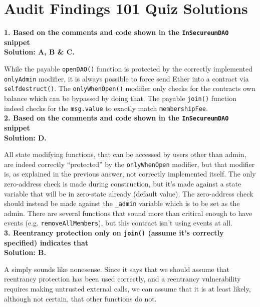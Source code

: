 \section{Audit Findings 101 Quiz Solutions}

\textbf{1. Based on the comments and code shown in the \texttt{InSecureumDAO} snippet}\label{sec:exam7_q1}\\

\textbf{Solution: A, B \& C.}

While the payable \verb|openDAO()| function is protected by the correctly implemented \verb|onlyAdmin| modifier, it is always possible to force send Ether into a contract via \verb|selfdestruct()|.
The \verb|onlyWhenOpen()| modifier only checks for the contracts own balance which can be bypassed by doing that.
The payable \verb|join()| function indeed checks for the \verb|msg.value| to exactly match \verb|membershipFee|.\\

\textbf{2. Based on the comments and code shown in the \texttt{InSecureumDAO} snippet}\label{sec:exam7_q2}\\

\textbf{Solution: D.}

All state modifying functions, that can be accessed by users other than admin, are indeed correctly ``protected'' by the \verb|onlyWhenOpen| modifier, but that modifier is, as explained in the previous answer, not correctly implemented itself.
The only zero-address check is made during construction, but it's made against a state variable that will be in zero-state already (default value).
The zero-address check should instead be made against the \verb|_admin| variable which is to be set as the admin.
There are several functions that sound more than critical enough to have events (e.g. \verb|removeAllMembers|), but this contract isn't using events at all.\\

\textbf{3. Reentrancy protection only on \texttt{join()} (assume it's correctly specified) indicates that}\label{sec:exam7_q3}\\

\textbf{Solution: B.}

A simply sounds like nonesense.
Since it says that we should assume that reentrancy protection has been used correctly, and a reentrancy vulnerability requires making untrusted external calls, we can assume that it is at least likely, although not certain, that other functions do not.\\

